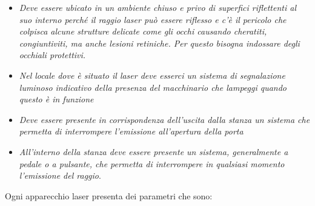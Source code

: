 \documentclass[]{article}
\begin{document}
\begin{itemize}
\item
  \emph{Deve essere ubicato in un ambiente chiuso e privo di superfici
  riflettenti al suo interno perché il raggio laser può essere riflesso
  e c'è il pericolo che colpisca alcune strutture delicate come gli
  occhi causando cheratiti, congiuntiviti, ma anche lesioni retiniche.
  Per questo bisogna indossare degli occhiali protettivi.}
\item
  \emph{Nel locale dove è situato il laser deve esserci un sistema di
  segnalazione luminoso indicativo della presenza del macchinario che
  lampeggi quando questo è in funzione}
\item
  \emph{Deve essere presente in corrispondenza dell'uscita dalla stanza
  un sistema che permetta di interrompere l'emissione all'apertura della
  porta}
\item
  \emph{All'interno della stanza deve essere presente un sistema,
  generalmente a pedale o a pulsante, che permetta di interrompere in
  qualsiasi momento l'emissione del raggio}.
\end{itemize}

Ogni apparecchio laser presenta dei parametri che sono:
\end{document}
